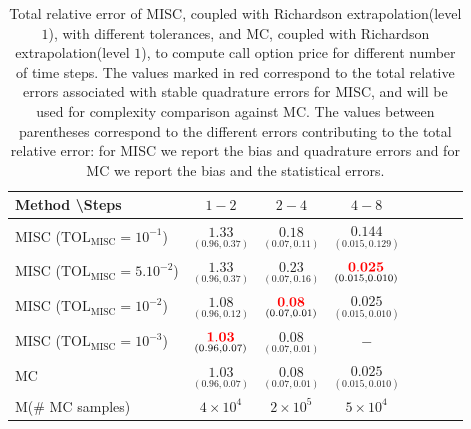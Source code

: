 

\begin{table}[h!]
	\centering
	\begin{tabular}{l*{6}{c}r}
		Method \textbackslash  Steps            & $1-2$ & $2-4$ & $4-8$  \\
		\hline
		MISC ($\text{TOL}_{\text{MISC}}=10^{-1}$)  & $\underset{(0.96,0.37)}{\mathbf{  1.33}}$ & $\underset{(0.07,0.11)}{\mathbf{0.18}}$ & $\underset{(0.015,0.129)}{\mathbf{0.144}}$   \\
		MISC ($\text{TOL}_{\text{MISC}}=5.10^{-2}$)  & $\underset{(0.96,0.37)}{\mathbf{  1.33}}$ & $\underset{(0.07,0.16)}{\mathbf{ 0.23}}$ & $\underset{(0.015,0.010)}{\mathbf{  {\color{red}0.025}}}$   \\
		MISC ($\text{TOL}_{\text{MISC}}=10^{-2}$)  & $\underset{(0.96,0.12)}{\mathbf{   1.08
		}}$ & $\underset{(0.07,0.01)}{\mathbf{    {\color{red}0.08}}}$ & $\underset{(0.015,0.010)}{\mathbf{ 0.025}}$  \\
		MISC ($\text{TOL}_{\text{MISC}}=10^{-3}$)  & $\underset{(0.96,0.07)}{\mathbf{ {\color{red}  1.03}}}$ & $\underset{(0.07,0.01)}{\mathbf{    0.08}}$ & $\mathbf{-}$  \\
		

		\hline
		
		MC &$\underset{(0.96,0.07)}{\mathbf{1.03}}$  & $\underset{(0.07,0.01)}{\mathbf{0.08}}$ & $\underset{(0.015,0.010)}{\mathbf{0.025}}$  \\
		M(\# MC samples) & $4 \times 10^4$  & $2 \times 10^5$ & $5 \times 10^4$  \\

		\hline
	\end{tabular}
	\caption{Total relative error of MISC, coupled with Richardson extrapolation(level $1$), with different tolerances,  and MC, coupled with Richardson extrapolation(level $1$), to compute call option price  for different number of time steps. The values marked in red correspond to the total relative errors associated with  stable quadrature errors for MISC, and will be used for complexity comparison against MC. The values between parentheses correspond to the different errors contributing to the total relative error: for MISC we report the bias and quadrature errors and for MC we report the bias and the statistical errors.}
	\label{Total  error of MISC and MC to compute Call option price of the different tolerances for different number of time steps. Case set $2$ parameters, with Richardson extrapolation(level $1$). The numbers between parentheses are the corresponding absolute errors,relative}
\end{table}


